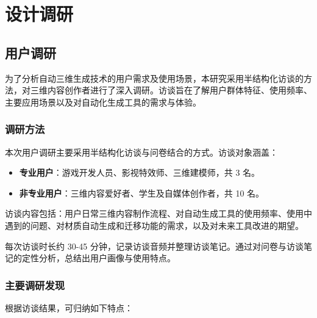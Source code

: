\section{设计调研}

\subsection{用户调研}

为了分析自动三维生成技术的用户需求及使用场景，本研究采用半结构化访谈的方法，对三维内容创作者进行了深入调研。访谈旨在了解用户群体特征、使用频率、主要应用场景以及对自动化生成工具的需求与体验。

\subsubsection{调研方法}

本次用户调研主要采用半结构化访谈与问卷结合的方式。访谈对象涵盖：

\begin{itemize}
  \item \textbf{专业用户}：游戏开发人员、影视特效师、三维建模师，共 3 名。
  \item \textbf{非专业用户}：三维内容爱好者、学生及自媒体创作者，共 10 名。
\end{itemize}

访谈内容包括：用户日常三维内容制作流程、对自动生成工具的使用频率、使用中遇到的问题、对材质自动生成和迁移功能的需求，以及对未来工具改进的期望。

每次访谈时长约 30-45 分钟，记录访谈音频并整理访谈笔记。通过对问卷与访谈笔记的定性分析，总结出用户画像与使用特点。

\subsubsection{主要调研发现}

根据访谈结果，可归纳如下特点：


